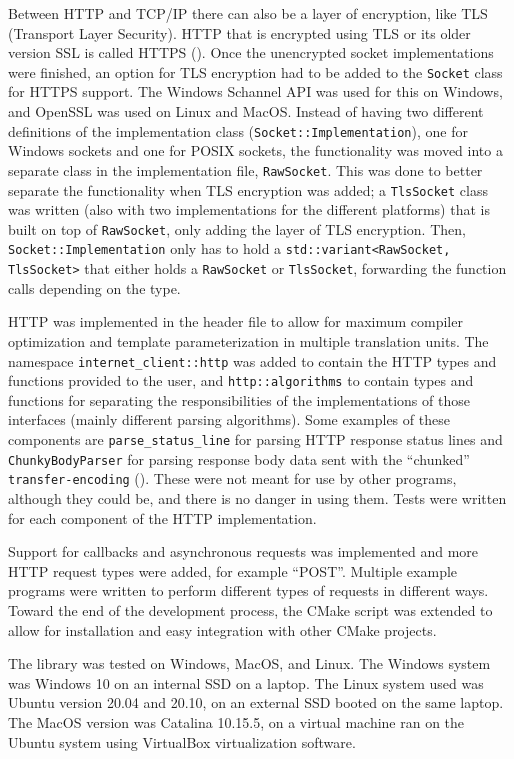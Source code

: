 \documentclass[12pt, a4paper]{article}
\begin{document}
Between HTTP and TCP/IP there can also be a layer of encryption, like TLS (Transport Layer Security). HTTP that is encrypted using TLS or its older version SSL is called HTTPS (\cite{HttpsGlossary}). Once the unencrypted socket implementations were finished, an option for TLS encryption had to be added to the \texttt{Socket} class for HTTPS support. The Windows Schannel API was used for this on Windows, and OpenSSL was used on Linux and MacOS. Instead of having two different definitions of the implementation class (\texttt{Socket::Implementation}), one for Windows sockets and one for POSIX sockets, the functionality was moved into a separate class in the implementation file, \texttt{RawSocket}. This was done to better separate the functionality when TLS encryption was added; a \texttt{TlsSocket} class was written (also with two implementations for the different platforms) that is built on top of \texttt{RawSocket}, only adding the layer of TLS encryption. Then, \texttt{Socket::Implementation} only has to hold a \texttt{std::variant<RawSocket, TlsSocket>} that either holds a \texttt{RawSocket} or \texttt{TlsSocket}, forwarding the function calls depending on the type.

HTTP was implemented in the header file to allow for maximum compiler optimization and template parameterization in multiple translation units. The namespace \texttt{internet\_client::http} was added to contain the HTTP types and functions provided to the user, and \texttt{http::algorithms} to contain types and functions for separating the responsibilities of the implementations of those interfaces (mainly different parsing algorithms). Some examples of these components are \texttt{parse\_status\_line} for parsing HTTP response status lines and \texttt{ChunkyBodyParser} for parsing response body data sent with the “chunked” \texttt{transfer-encoding} (\cite{HttpTransferEncoding}). These were not meant for use by other programs, although they could be, and there is no danger in using them. Tests were written for each component of the HTTP implementation.

Support for callbacks and asynchronous requests was implemented and more HTTP request types were added, for example “POST”. Multiple example programs were written to perform different types of requests in different ways. Toward the end of the development process, the CMake script was extended to allow for installation and easy integration with other CMake projects.

The library was tested on Windows, MacOS, and Linux. The Windows system was Windows 10 on an internal SSD on a laptop. The Linux system used was Ubuntu version 20.04 and 20.10, on an external SSD booted on the same laptop. The MacOS version was Catalina 10.15.5, on a virtual machine ran on the Ubuntu system using VirtualBox virtualization software.
\end{document}
